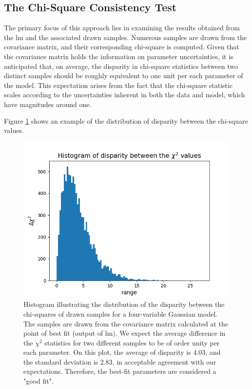 \documentclass[12pt, TexShade, letterpaper]{report}
\begin{document}
\subsection{The Chi-Square Consistency Test}
\label{chap:method,sub:test,subsub:chi}
The primary focus of this approach lies in examining the results obtained from the \gls{lm} and the associated drawn samples. Numerous samples are drawn from the covariance matrix, and their corresponding chi-square is computed. Given that the covariance matrix holds the information on parameter uncertainties, it is anticipated that, on average, the disparity in chi-square statistics between two distinct samples should be roughly equivalent to one unit per each parameter of the model. This expectation arises from the fact that the chi-square statistic scales according to the uncertainties inherent in both the data and model, which have magnitudes around one.\par
Figure \ref{fig:csq_test} shows an example of the distribution of disparity between the chi-square values.\par

\begin{figure}[h!]
\centering
\includegraphics[scale =0.8]{csq_hist.png}
\caption[Histogram of disparity in the chi-square values of drawn samples]{Histogram illustrating the distribution of the disparity between the chi-squares of drawn samples for a four-variable Gaussian model. The samples are drawn from the covariance matrix calculated at the point of best fit (output of \gls{lm}). We expect the average difference in the $\chi^2$ statistics for two different samples to be of order unity per each parameter.
On this plot, the average of disparity is 4.03, and the standard deviation is 2.83, in acceptable agreement with our expectations. Therefore, the best-fit parameters are considered a "good fit".}
\label{fig:csq_test}
\end{figure}
\end{document}
